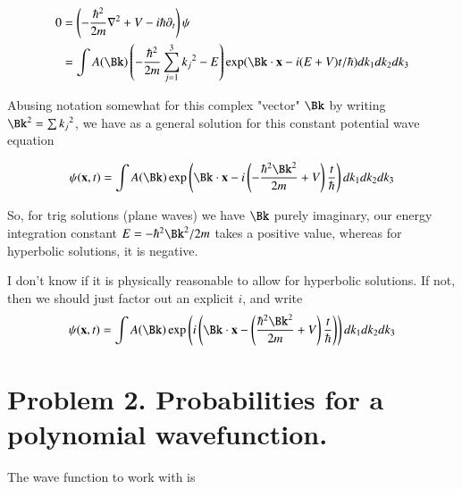 \documentclass{article}
\begin{document}
\begin{align*}
0 
&= \left(-\frac{\hbar^2}{2m}\grad^2 + V -i\hbar \partial_t\right)\psi \\
&= \int A(\Bk) \left(-\frac{\hbar^2}{2m}\sum_{j=1}^3 {k_j}^2 - E\right) \exp(\Bk \cdot \Bx - i(E + V) t/\hbar) dk_1 dk_2 dk_3 \\
\end{align*}

Abusing notation somewhat for this complex "vector" $\Bk$ by writing $\Bk^2 = \sum {k_j}^2$, we have
as a general solution for this constant potential wave equation

\begin{align*}
\psi(\Bx,t) = \int A(\Bk) \exp\left(\Bk \cdot \Bx - i\left(-\frac{\hbar^2 \Bk^2}{2m} + V\right) \frac{t}{\hbar}\right) dk_1 dk_2 dk_3 \\
\end{align*}

So, for trig solutions (plane waves) we have $\Bk$ purely imaginary, our energy integration constant $E = -\hbar^2\Bk^2/2m$ takes a positive value, whereas for hyperbolic solutions, it is negative.

I don't know if it is physically reasonable to allow for hyperbolic solutions.  If not, then we should just
factor out an explicit $i$, and write
\begin{align*}
\psi(\Bx,t) = \int A(\Bk) \exp\left(i \left(\Bk \cdot \Bx - \left(\frac{\hbar^2 \Bk^2}{2m} + V\right) \frac{t}{\hbar}\right)\right) dk_1 dk_2 dk_3 \\
\end{align*}

%

\section{ Problem 2. Probabilities for a polynomial wavefunction. }

The wave function to work with is
\end{document}
